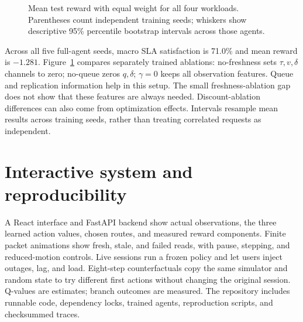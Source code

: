 \documentclass[10pt,a4paper,twocolumn]{article}
\begin{document}
\begin{figure}[t]
\centering
{}
\caption{Mean test reward with equal weight for all four workloads.
Parentheses count independent training seeds; whiskers show descriptive
95\% percentile bootstrap intervals across those agents.}
\label{fig:ablations}
\end{figure}

Across all five full-agent seeds, macro SLA satisfaction is 71.0\% and mean
reward is $-1.281$. Figure~\ref{fig:ablations} compares separately trained
ablations: no-freshness sets $\tau,v,\delta$ channels to zero; no-queue zeros
$q,\delta$; $\gamma=0$ keeps all observation features. Queue and replication
information help in this setup. The small freshness-ablation gap does not show
that these features are always needed. Discount-ablation differences can also
come from optimization effects. Intervals resample mean results across
training seeds, rather than treating correlated requests as independent.

\newpage %
\section{Interactive system and reproducibility}
A React interface and FastAPI backend show actual observations, the three
learned action values, chosen routes, and measured reward components. Finite
packet animations show fresh, stale, and failed reads, with pause, stepping,
and reduced-motion controls. Live sessions run a frozen policy and let users
inject outages, lag, and load. Eight-step counterfactuals copy the same simulator
and random state to try different first actions without changing the original
session. Q-values are estimates; branch outcomes are measured. The repository
includes runnable code, dependency locks, trained agents, reproduction scripts,
and checksummed traces.
\end{document}
